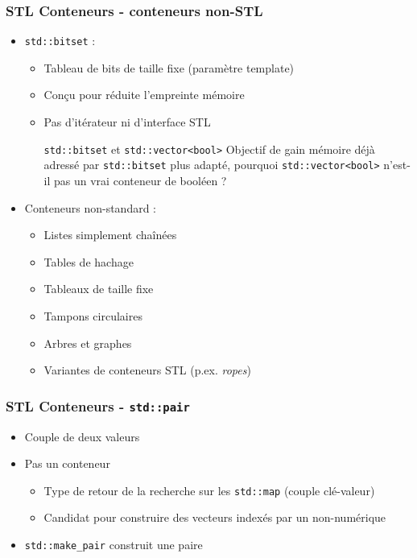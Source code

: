 \documentclass[C++.tex]{subfiles}
\begin{document}
\begin{frame}
	\frametitle{STL Conteneurs - conteneurs non-STL}


	\begin{itemize}
		\item \lstinline|std::bitset| :
		\begin{itemize}
			\item Tableau de bits de taille fixe (paramètre template)
			\item Conçu pour réduite l'empreinte mémoire
			\item Pas d'itérateur ni d'interface \og STL\fg{}

			\begin{block}{\lstinline|std::bitset| et \lstinline|std::vector<bool>|}
				Objectif de gain mémoire déjà adressé par \lstinline|std::bitset| plus adapté, pourquoi \lstinline|std::vector<bool>| n'est-il pas un vrai conteneur de booléen ?
			\end{block}

		\end{itemize}
		\item Conteneurs non-standard :
		\begin{itemize}
			\item Listes simplement chaînées
			\item Tables de hachage
			\item Tableaux de taille fixe
			\item Tampons circulaires
			\item Arbres et graphes
			\item Variantes de conteneurs \og STL\fg{} (p.ex. \og \textit{ropes}\fg{})

		\end{itemize}
	\end{itemize}
\end{frame}

\begin{frame}
	\frametitle{STL Conteneurs - \lstinline|std::pair|}
	\begin{itemize}
		\item Couple de deux valeurs
		\item Pas un conteneur
		\begin{itemize}
			\item Type de retour de la recherche sur les \lstinline|std::map| (couple clé-valeur)
			\item Candidat pour construire des vecteurs indexés par un non-numérique
		\end{itemize}
		\item \lstinline|std::make_pair| construit une paire
	\end{itemize}
\end{frame}
\end{document}
